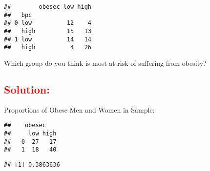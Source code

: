 \documentclass[]{article}
\newenvironment{Shaded}{\begin{snugshade}}{\end{snugshade}}
\newcommand{\KeywordTok}[1]{\textcolor[rgb]{0.13,0.29,0.53}{\textbf{#1}}}
\newcommand{\DataTypeTok}[1]{\textcolor[rgb]{0.13,0.29,0.53}{#1}}
\newcommand{\DecValTok}[1]{\textcolor[rgb]{0.00,0.00,0.81}{#1}}
\newcommand{\FloatTok}[1]{\textcolor[rgb]{0.00,0.00,0.81}{#1}}
\newcommand{\StringTok}[1]{\textcolor[rgb]{0.31,0.60,0.02}{#1}}
\newcommand{\CommentTok}[1]{\textcolor[rgb]{0.56,0.35,0.01}{\textit{#1}}}
\newcommand{\OperatorTok}[1]{\textcolor[rgb]{0.81,0.36,0.00}{\textbf{#1}}}
\newcommand{\NormalTok}[1]{#1}
\begin{document}
\begin{Shaded}
\end{Shaded}

\begin{verbatim}
##        obesec low high
##   bpc                 
## 0 low          12    4
##   high         15   13
## 1 low          14   14
##   high          4   26
\end{verbatim}

Which group do you think is most at risk of suffering from obesity?

\subsection{\texorpdfstring{\textcolor{red}{Solution:}}{}}\label{section-12}

Proportions of Obese Men and Women in Sample:

\begin{Shaded}
\end{Shaded}

\begin{verbatim}
##    obesec
##     low high
##   0  27   17
##   1  18   40
\end{verbatim}

\begin{Shaded}
\end{Shaded}

\begin{verbatim}
## [1] 0.3863636
\end{verbatim}
\end{document}
